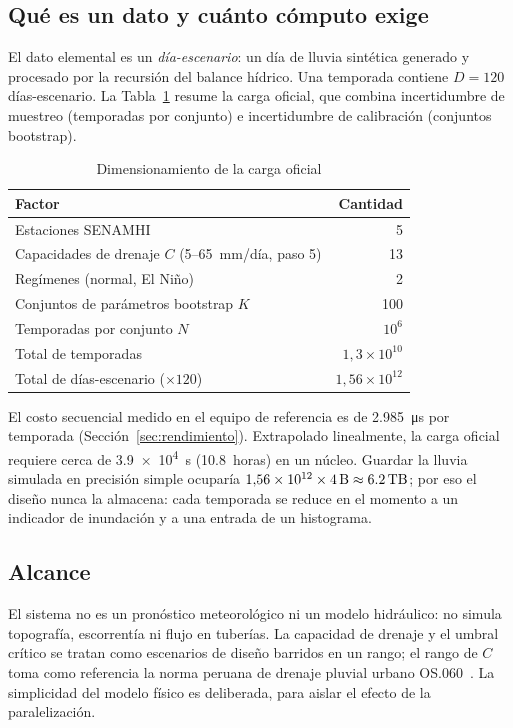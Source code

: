 \subsection{Qué es un dato y cuánto cómputo exige}

El dato elemental es un \emph{día-escenario}: un día de lluvia sintética generado y procesado por la recursión del balance hídrico. Una temporada contiene $D = 120$ días-escenario. La Tabla~\ref{tab:dimensionamiento} resume la carga oficial, que combina incertidumbre de muestreo (temporadas por conjunto) e incertidumbre de calibración (conjuntos bootstrap).

\begin{table}[!t]
\centering
\caption{Dimensionamiento de la carga oficial}
\label{tab:dimensionamiento}
\begin{tabular}{@{}lr@{}}
\toprule
Factor & Cantidad \\
\midrule
Estaciones SENAMHI & 5 \\
Capacidades de drenaje $C$ (5--65~mm/día, paso 5) & 13 \\
Regímenes (normal, El Niño) & 2 \\
Conjuntos de parámetros bootstrap $K$ & 100 \\
Temporadas por conjunto $N$ & $10^{6}$ \\
\midrule
Total de temporadas & $1{,}3\times10^{10}$ \\
Total de días-escenario ($\times 120$) & $1{,}56\times10^{12}$ \\
\bottomrule
\end{tabular}
\end{table}

El costo secuencial medido en el equipo de referencia es de \qty{2.985}{\micro\second} por temporada (Sección~\ref{sec:rendimiento}). Extrapolado linealmente, la carga oficial requiere cerca de \qty{3.9e4}{\second} (\num{10.8}~horas) en un núcleo. Guardar la lluvia simulada en precisión simple ocuparía $1{,}56\times10^{12}\times\qty{4}{\byte} \approx \qty{6.2}{\tera\byte}$; por eso el diseño nunca la almacena: cada temporada se reduce en el momento a un indicador de inundación y a una entrada de un histograma.

\subsection{Alcance}

El sistema no es un pronóstico meteorológico ni un modelo hidráulico: no simula topografía, escorrentía ni flujo en tuberías. La capacidad de drenaje y el umbral crítico se tratan como escenarios de diseño barridos en un rango; el rango de $C$ toma como referencia la norma peruana de drenaje pluvial urbano OS.060~\cite{os060}. La simplicidad del modelo físico es deliberada, para aislar el efecto de la paralelización.
